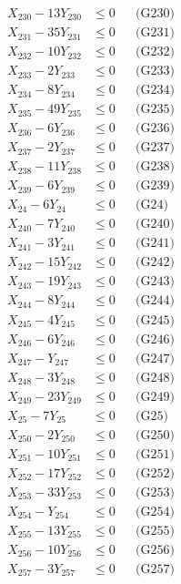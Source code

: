 \documentclass[a4paper,10pt]{article}
\begin{document}
{\begin{align}
X_{230} - 13Y_{230} &\leq 0 && \text{(G230)} \\
X_{231} - 35Y_{231} &\leq 0 && \text{(G231)} \\
X_{232} - 10Y_{232} &\leq 0 && \text{(G232)} \\
X_{233} - 2Y_{233} &\leq 0 && \text{(G233)} \\
X_{234} - 8Y_{234} &\leq 0 && \text{(G234)} \\
X_{235} - 49Y_{235} &\leq 0 && \text{(G235)} \\
X_{236} - 6Y_{236} &\leq 0 && \text{(G236)} \\
X_{237} - 2Y_{237} &\leq 0 && \text{(G237)} \\
X_{238} - 11Y_{238} &\leq 0 && \text{(G238)} \\
X_{239} - 6Y_{239} &\leq 0 && \text{(G239)} \\
X_{24} - 6Y_{24} &\leq 0 && \text{(G24)} \\
X_{240} - 7Y_{240} &\leq 0 && \text{(G240)} \\
X_{241} - 3Y_{241} &\leq 0 && \text{(G241)} \\
\allowbreak
X_{242} - 15Y_{242} &\leq 0 && \text{(G242)} \\
X_{243} - 19Y_{243} &\leq 0 && \text{(G243)} \\
X_{244} - 8Y_{244} &\leq 0 && \text{(G244)} \\
X_{245} - 4Y_{245} &\leq 0 && \text{(G245)} \\
X_{246} - 6Y_{246} &\leq 0 && \text{(G246)} \\
X_{247} - Y_{247} &\leq 0 && \text{(G247)} \\
X_{248} - 3Y_{248} &\leq 0 && \text{(G248)} \\
X_{249} - 23Y_{249} &\leq 0 && \text{(G249)} \\
X_{25} - 7Y_{25} &\leq 0 && \text{(G25)} \\
X_{250} - 2Y_{250} &\leq 0 && \text{(G250)} \\
X_{251} - 10Y_{251} &\leq 0 && \text{(G251)} \\
X_{252} - 17Y_{252} &\leq 0 && \text{(G252)} \\
X_{253} - 33Y_{253} &\leq 0 && \text{(G253)} \\
X_{254} - Y_{254} &\leq 0 && \text{(G254)} \\
X_{255} - 13Y_{255} &\leq 0 && \text{(G255)} \\
X_{256} - 10Y_{256} &\leq 0 && \text{(G256)} \\
X_{257} - 3Y_{257} &\leq 0 && \text{(G257)} \\

\end{align}}
\end{document}
